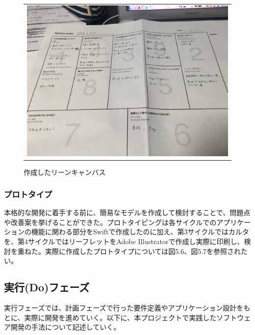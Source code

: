 \begin{figure}[htbp]
  \begin{flushleft}
    \begin{tabular}{c}

      \begin{minipage}{0.7\hsize}
        \begin{center}
\includegraphics[width=15cm, bb=0 0 1280 960]{procedure-2.png}
       
        \end{center}
      \end{minipage}

    \end{tabular}
    \caption{作成したリーンキャンバス}
    \label{fig:lena}
  \end{flushleft}
\end{figure}
\subsubsection{プロトタイプ}
本格的な開発に着手する前に、簡易なモデルを作成して検討することで、問題点や改善案を挙げることができた。プロトタイピングは各サイクルでのアプリケーションの機能に関わる部分をSwiftで作成したのに加え、第3サイクルではカルタを、第4サイクルではリーフレットをAdobe Illustratorで作成し実際に印刷し、検討を重ねた。実際に作成したプロトタイプについては図5.6、図5.7を参照されたい。
\subsection{実行(Do)フェーズ}
実行フェーズでは、計画フェーズで行った要件定義やアプリケーション設計をもとに、実際に開発を進めていく。以下に、本プロジェクトで実践したソフトウェア開発の手法について記述していく。
